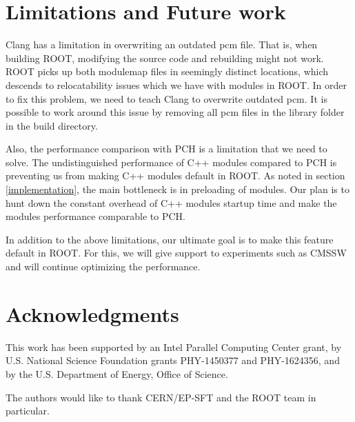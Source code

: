 \documentclass{webofc}
\begin{document}
\section{Limitations and Future work}
\label{limitationsandfuture}

Clang has a limitation in overwriting an outdated pcm file. That is, when building ROOT, modifying the source code and rebuilding might not work. ROOT picks up both modulemap files in seemingly distinct locations, which descends to relocatability issues which we have with modules in ROOT. In order to fix this problem, we need to teach Clang to overwrite outdated pcm. It is possible to work around this issue by removing all pcm files in the library folder in the build directory.

Also, the performance comparison with PCH is a limitation that we need to solve. The undistinguished performance of C++ modules compared to PCH is preventing us from making C++ modules default in ROOT. As noted in section \ref{implementation}, the main bottleneck is in preloading of modules. Our plan is to hunt down the constant overhead of C++ modules startup time and make the modules performance comparable to PCH.

In addition to the above limitations, our ultimate goal is to make this feature default in ROOT. For this, we will give support to experiments such as CMSSW and will continue optimizing the performance.

\section{Acknowledgments}

This work has been supported by an Intel Parallel Computing Center grant, by U.S. National Science Foundation grants PHY-1450377 and PHY-1624356, and by the U.S. Department of Energy, Office of Science.

The authors would like to thank CERN/EP-SFT and the ROOT team in particular.
\end{document}
